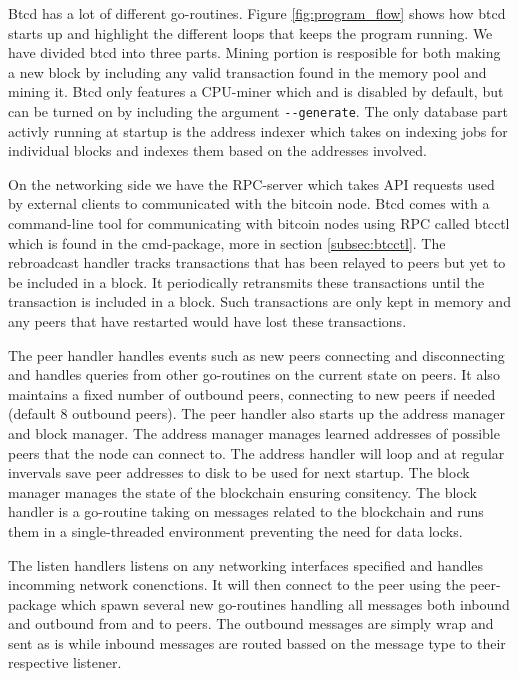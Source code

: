 \documentclass[12pt]{article}
\begin{document}
Btcd has a lot of different go-routines. Figure \ref{fig:program_flow} shows how btcd starts up and highlight the different loops that keeps the program running. We have divided btcd into three parts. Mining portion is resposible for both making a new block by including any valid transaction found in the memory pool and mining it. Btcd only features a CPU-miner which and is disabled by default, but can be turned on by including the argument \texttt{-{}-generate}. The only database part activly running at startup is the address indexer which takes on indexing jobs for individual blocks and indexes them based on the addresses involved.

On the networking side we have the RPC-server which takes API requests used by external clients to communicated with the bitcoin node. Btcd comes with a command-line tool for communicating with bitcoin nodes using RPC called btcctl which is found in the cmd-package, more in section \ref{subsec:btcctl}. The rebroadcast handler tracks transactions that has been relayed to peers but yet to be included in a block. It periodically retransmits these transactions until the transaction is included in a block. Such transactions are only kept in memory and any peers that have restarted would have lost these transactions.

The peer handler handles events such as new peers connecting and disconnecting and handles queries from other go-routines on the current state on peers. It also maintains a fixed number of outbound peers, connecting to new peers if needed (default 8 outbound peers). The peer handler also starts up the address manager and block manager. The address manager manages learned addresses of possible peers that the node can connect to. The address handler will loop and at regular invervals save peer addresses to disk to be used for next startup. The block manager manages the state of the blockchain ensuring consitency. The block handler is a go-routine taking on messages related to the blockchain and runs them in a single-threaded environment preventing the need for data locks.

The listen handlers listens on any networking interfaces specified and handles incomming network conenctions. It will then connect to the peer using the peer-package which spawn several new go-routines handling all messages both inbound and outbound from and to peers. The outbound messages are simply wrap and sent as is while inbound messages are routed bassed on the message type to their respective listener.
\end{document}
